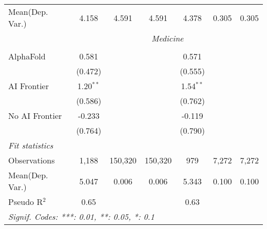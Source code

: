 \begin{tabular}{lcccccc}
Mean(Dep. Var.) & 4.158 & 4.591 & 4.591 & 4.378 & 0.305 & 0.305 \\
 & \multicolumn{6}{c}{\textit{Medicine}} \\ \\
   AlphaFold      & 0.581       &         &         & 0.571       &       &   \\   
                  & (0.472)     &         &         & (0.555)     &       &   \\   
   AI Frontier    & 1.20$^{**}$ &         &         & 1.54$^{**}$ &       &   \\   
                  & (0.586)     &         &         & (0.762)     &       &   \\   
   No AI Frontier & -0.233      &         &         & -0.119      &       &   \\   
                  & (0.764)     &         &         & (0.790)     &       &   \\   
   \midrule
   \emph{Fit statistics}\\
   Observations   & 1,188       & 150,320 & 150,320 & 979         & 7,272 & 7,272\\  
Mean(Dep. Var.) & 5.047 & 0.006 & 0.006 & 5.343 & 0.100 & 0.100 \\
   Pseudo R$^2$   & 0.65        &         &         & 0.63        &       & \\  
   \midrule \midrule
   \multicolumn{7}{l}{\emph{Signif. Codes: ***: 0.01, **: 0.05, *: 0.1}}\\
\end{tabular}
\par\endgroup
